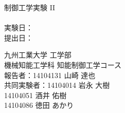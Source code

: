 \begin{titlepage}
  \vspace*{30mm}
  \begin{center}
    {\huge 制御工学実験 I\hspace{-0.1mm}I \\}
    \vspace{5mm}
    {\Huge \exptname \\}
    \vspace{20mm}
    {\Large 実験日：\exptdate \\}
    {\Large 提出日：\submission \\}
  \end{center}
  \vspace{25mm}
  \begin{flushright}
    {\LARGE 九州工業大学 工学部 \\}
    {\LARGE 機械知能工学科 知能制御工学コース \\}
    \vspace{10mm}
    {\Large     報告者：{\large 14104131} \hspace{1mm} 山崎 達也　 \\}
    {\Large 共同実験者：{\large 14104014} \hspace{1mm} 岩永 大樹　 \\
                        {\large 14104051} \hspace{1mm} 酒井 佑樹　 \\
                        {\large 14104086} \hspace{1mm} 徳田 あかり \\}
  \end{flushright}
\end{titlepage}

